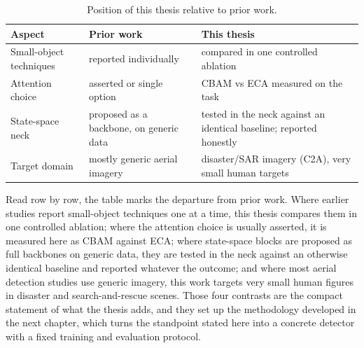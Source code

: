 \begin{table}[H]
  \centering
  \caption{Position of this thesis relative to prior work.}
  \label{tab:gap}
  \small
  \setlength{\tabcolsep}{5pt}
  \renewcommand{\arraystretch}{1.15}
  \begin{tabular}{@{}p{3.8cm} p{4.7cm} p{4.7cm}@{}}
    \toprule
    \textbf{Aspect} & \textbf{Prior work} & \textbf{This thesis} \\
    \midrule
    Small-object techniques & reported individually & compared in one controlled ablation \\
    Attention choice & asserted or single option & CBAM vs ECA measured on the task \\
    State-space neck & proposed as a backbone, on generic data & tested in the neck against an identical baseline; reported honestly \\
    Target domain & mostly generic aerial imagery & disaster/SAR imagery (C2A), very small human targets \\
    \bottomrule
  \end{tabular}
\end{table}

Read row by row, the table marks the departure from prior work. Where earlier
studies report small-object techniques one at a time, this thesis compares them
in one controlled ablation; where the attention choice is usually asserted, it
is measured here as CBAM against ECA; where state-space blocks are proposed as
full backbones on generic data, they are tested in the neck against an
otherwise identical baseline and reported whatever the outcome; and where most
aerial detection studies use generic imagery, this work targets very small
human figures in disaster and search-and-rescue scenes. Those four contrasts
are the compact statement of what the thesis adds, and they set up the
methodology developed in the next chapter, which turns the standpoint stated
here into a concrete detector with a fixed training and evaluation protocol.
